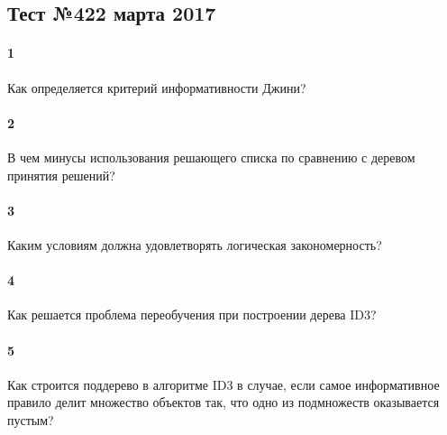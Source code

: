 \documentclass[a4paper,12pt]{article}
\begin{document}
  \subsection*{Тест №4\hfill{22 марта 2017}}

  \paragraph{1} Как определяется критерий информативности Джини?
  
  \makebox[\linewidth]{\hrulefill}
  \makebox[\linewidth]{\hrulefill}
  
  \paragraph{2} В чем минусы использования решающего списка по сравнению с
  деревом принятия решений?

  \makebox[\linewidth]{\hrulefill}
  \makebox[\linewidth]{\hrulefill}
  \makebox[\linewidth]{\hrulefill}
  \makebox[\linewidth]{\hrulefill}

  \paragraph{3} Каким условиям должна удовлетворять логическая закономерность?

  \makebox[\linewidth]{\hrulefill}
  \makebox[\linewidth]{\hrulefill}
  \makebox[\linewidth]{\hrulefill}
  \makebox[\linewidth]{\hrulefill}

  \paragraph{4} Как решается проблема переобучения при построении дерева ID3?

  \makebox[\linewidth]{\hrulefill}
  \makebox[\linewidth]{\hrulefill}
  \makebox[\linewidth]{\hrulefill}
  \makebox[\linewidth]{\hrulefill}

  \paragraph{5} Как строится поддерево в алгоритме ID3 в случае, если самое
  информативное правило делит множество объектов так, что одно из подмножеств
  оказывается пустым?

  \makebox[\linewidth]{\hrulefill}
  \makebox[\linewidth]{\hrulefill}
  \makebox[\linewidth]{\hrulefill}
  \makebox[\linewidth]{\hrulefill}
  
\end{document}
